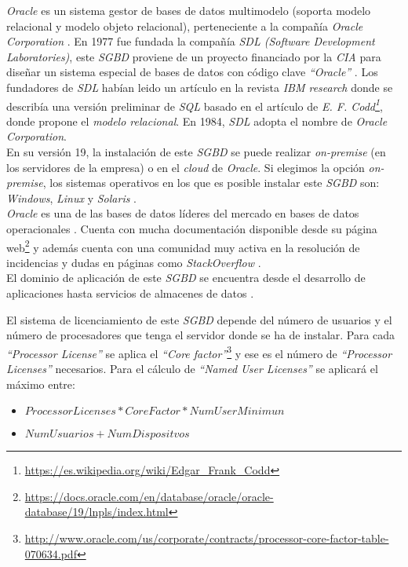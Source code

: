 \documentclass{article}
\begin{document}
\emph{Oracle} es un sistema gestor de bases de datos multimodelo (soporta modelo relacional y modelo objeto relacional), perteneciente a la compañía \emph{Oracle Corporation} \cite{WIKI:1} . En 1977 fue fundada la compañía \emph{SDL (Software Development Laboratories)}, este \emph{SGBD} proviene de un proyecto financiado por la \emph{CIA} para diseñar un sistema especial de bases de datos con código clave \emph{``Oracle''} \cite{WIKI:2}. Los fundadores de \emph{SDL} habían leido un artículo en la revista \emph{IBM research} donde se describía una versión preliminar de \emph{SQL} basado en el artículo de \emph{E. F. Codd\footnote{\url{https://es.wikipedia.org/wiki/Edgar_Frank_Codd}}}, donde propone el \emph{modelo relacional}. En 1984, \emph{SDL} adopta el nombre de \emph{Oracle Corporation}.\\

En su versión 19, la instalación de este \emph{SGBD} se puede realizar \emph{on-premise} (en los servidores de la empresa) o en el \emph{cloud} de \emph{Oracle}. Si elegimos la opción \emph{on-premise}, los sistemas operativos en los que es posible instalar este \emph{SGBD} son: \emph{Windows}, \emph{Linux} y \emph{Solaris} \cite{ORA:1}.\\

\emph{Oracle} es una de las bases de datos líderes del mercado en bases de datos operacionales \cite{GART:1}. Cuenta con mucha documentación disponible desde su página web\footnote{\url{https://docs.oracle.com/en/database/oracle/oracle-database/19/lnpls/index.html}} y además cuenta con una comunidad muy activa en la resolución de incidencias y dudas en páginas como \emph{StackOverflow} \cite{STO:1}.\\

El dominio de aplicación de este \emph{SGBD} se encuentra desde el desarrollo de aplicaciones hasta servicios de almacenes de datos \cite{ORA:2}.

El sistema de licenciamiento de este \emph{SGBD} depende del número de usuarios y el número de procesadores que tenga el servidor donde se ha de instalar. Para cada \emph{``Processor License''} se aplica el \emph{``Core factor''}\footnote{\url{http://www.oracle.com/us/corporate/contracts/processor-core-factor-table-070634.pdf}} y ese es el número de \emph{``Processor Licenses''} necesarios. Para el cálculo de \emph{``Named User Licenses''} se aplicará el máximo entre:

\begin{itemize}
\item $ProcessorLicenses * CoreFactor * NumUserMinimun$
\item $NumUsuarios + NumDispositvos$
\end{itemize}
\end{document}
